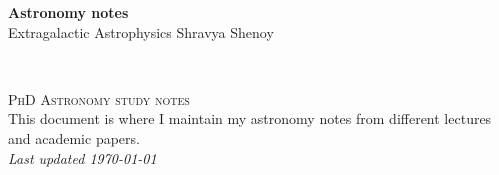 \documentclass[6pt,oneside]{book} %
\let\par\DTLpar%
\begin{document}

\begingroup
\thispagestyle{empty}
\centering
\vspace*{5cm}
\par\normalfont\fontsize{35}{35}\sffamily\selectfont
\textbf{Astronomy notes}\\
{\LARGE Extragalactic Astrophysics}\par %
\vspace*{1cm}
{\Large Shravya Shenoy}\par %
\endgroup


\newpage
~\vfill
\thispagestyle{empty}


\noindent \textsc{PhD Astronomy study notes}\\


\noindent This document is where I maintain my astronomy notes from different lectures and academic papers.\\ %

\noindent \textit{Last updated \today} %



\pagestyle{empty} %

\tableofcontents %


\pagestyle{fancy} %
\end{document}
